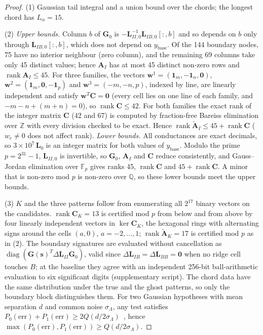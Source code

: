 \documentclass[11pt,a4paper]{article}
\theoremstyle{definition}
\theoremstyle{remark}
\begin{document}
\begin{proof}
(1) Gaussian tail integral and a union bound over the chords; the longest chord has $L_\alpha = 15$.

(2) \emph{Upper bounds.} Column $b$ of $\mathbf{G}_0$ is $-\mathbf{L}_{II,0}^{-1}\mathbf{L}_{IB,0}[:,b]$ and so depends on $b$ only through $\mathbf{L}_{IB,0}[:,b]$, which does not depend on $y_{\text{base}}$. Of the 144 boundary nodes, 75 have no interior neighbour (zero column), and the remaining 69 columns take only 45 distinct values; hence $\mathbf{A}_I$ has at most 45 distinct non-zero rows and $\operatorname{rank}\mathbf{A}_I\le45$. For three families, the vectors $\mathbf{w}^{1} = (\mathbf{1}_m,-\mathbf{1}_n,\mathbf{0})$, $\mathbf{w}^{2} = (\mathbf{1}_m,\mathbf{0},-\mathbf{1}_p)$ and $\mathbf{w}^{3} = (-m,-n,p)$, indexed by line, are linearly independent and satisfy $\mathbf{w}^T\mathbf{C} = \mathbf{0}$ (every cell lies on one line of each family, and $-m-n+(m+n) = 0$), so $\operatorname{rank}\mathbf{C}\le 42$. For both families the exact rank of the integer matrix $\mathbf{C}$ (42 and 67) is computed by fraction-free Bareiss elimination over $\mathbb{Z}$ with every division checked to be exact. Hence $\operatorname{rank}\widetilde{\mathbf{A}}_I \le 45+\operatorname{rank}\mathbf{C}$ ($w_c\ne0$ does not affect rank). \emph{Lower bounds.} All conductances are exact decimals, so $3\times10^7\,\mathbf{L}_0$ is an integer matrix for both values of $y_{\text{base}}$. Modulo the prime $p = 2^{31}-1$, $\mathbf{L}_{II,0}$ is invertible, so $\mathbf{G}_0$, $\mathbf{A}_I$ and $\mathbf{C}$ reduce consistently, and Gauss--Jordan elimination over $\mathbb{F}_p$ gives ranks 45, $\operatorname{rank}\mathbf{C}$ and $45+\operatorname{rank}\mathbf{C}$. A minor that is non-zero mod $p$ is non-zero over $\mathbb{Q}$, so these lower bounds meet the upper bounds.

(3) $K$ and the three patterns follow from enumerating all $2^{17}$ binary vectors on the candidates. $\operatorname{rank}\mathbf{C}_K = 13$ is certified mod $p$ from below and from above by four linearly independent vectors in $\ker\mathbf{C}_K$, the hexagonal rings with alternating signs around the cells $(a,0)$, $a = -2,\dots,1$; $\operatorname{rank}\widetilde{\mathbf{A}}_K = 17$ is certified mod $p$ as in (2). The boundary signatures are evaluated without cancellation as $\operatorname{diag}(\mathbf{G}(\mathbf{s})^T\Delta\mathbf{L}_{II}\mathbf{G}_0)$, valid since $\Delta\mathbf{L}_{IB} = \Delta\mathbf{L}_{BB} = \mathbf{0}$ when no ridge cell touches $B$; at the baseline they agree with an independent 256-bit ball-arithmetic evaluation to six significant digits (supplementary script). The chord data have the same distribution under the true and the ghost patterns, so only the boundary block distinguishes them. For two Gaussian hypotheses with mean separation $d$ and common noise $\sigma_\Lambda$, any test satisfies $P_0(\text{err})+P_1(\text{err}) \ge 2Q(d/2\sigma_\Lambda)$~\cite{tsybakov2009}, hence $\max(P_0(\text{err}),P_1(\text{err}))\ge Q(d/2\sigma_\Lambda)$.


\end{proof}
\end{document}
